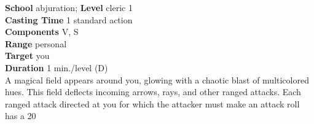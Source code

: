 \textbf{School} abjuration; \textbf{Level} cleric 1\\
\textbf{Casting Time} 1 standard action\\
\textbf{Components} V, S\\
\textbf{Range} personal\\
\textbf{Target} you\\
\textbf{Duration} 1 min./level (D)\\
A magical field appears around you, glowing with a chaotic blast of multicolored hues. This field deflects incoming arrows, rays, and other ranged attacks. Each ranged attack directed at you for which the attacker must make an attack roll has a 20%

